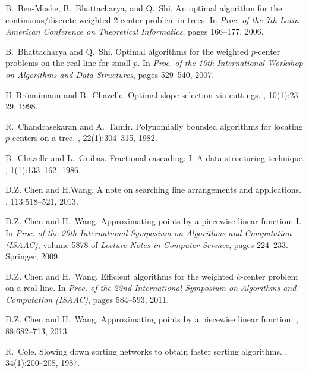 \documentclass{llncs}
\begin{document}
\begin{thebibliography}{10}

B.~Ben-Moshe, B.~Bhattacharya, and Q.~Shi.
\newblock An optimal algorithm for the continuous/discrete weighted 2-center
  problem in trees.
\newblock In {\em Proc. of the 7th Latin American Conference on Theoretical
  Informatics}, pages 166--177, 2006.

B.~Bhattacharya and Q.~Shi.
\newblock Optimal algorithms for the weighted $p$-center problems on the real
  line for small $p$.
\newblock In {\em Proc. of the 10th International Workshop on Algorithms and
  Data Structures}, pages 529--540, 2007.

H~{Br\"onnimann} and B.~Chazelle.
\newblock Optimal slope selection via cuttings.
, 10(1):23--29,
  1998.

R.~Chandrasekaran and A.~Tamir.
\newblock Polynomially bounded algorithms for locating {$p$-centers} on a tree.
, 22(1):304--315, 1982.

B.~Chazelle and L.~Guibas.
\newblock Fractional cascading: {I. A} data structuring technique.
, 1(1):133--162, 1986.

D.Z. Chen and H.Wang.
\newblock A note on searching line arrangements and applications.
, 113:518--521, 2013.

D.Z. Chen and H.~Wang.
\newblock Approximating points by a piecewise linear function: {I}.
\newblock In {\em Proc. of the 20th International Symposium on Algorithms and
  Computation (ISAAC)}, volume 5878 of {\em Lecture Notes in Computer Science},
  pages 224--233. Springer, 2009.

D.Z. Chen and H.~Wang.
\newblock Efficient algorithms for the weighted {$k$}-center problem on a real
  line.
\newblock In {\em Proc. of the 22nd International Symposium on Algorithms and
  Computation (ISAAC)}, pages 584--593, 2011.

D.Z. Chen and H.~Wang.
\newblock Approximating points by a piecewise linear function.
, 88:682--713, 2013.

R.~Cole.
\newblock Slowing down sorting networks to obtain faster sorting algorithms.
, 34(1):200--208, 1987.


\end{thebibliography}
\end{document}
